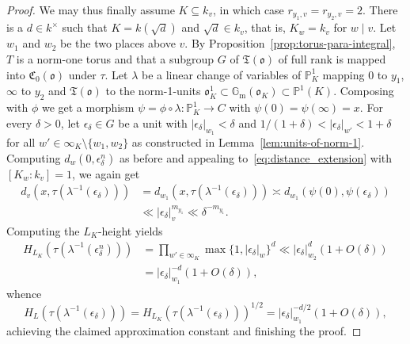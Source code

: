 \documentclass[a4paper, twoside, 11pt]{amsart}
\theoremstyle{definition}
\newcommand{\mC}{\mathfrak{C}}
\newcommand{\mT}{\mathfrak{T}}
\newcommand{\fo}{\mathfrak{o}}
\newcommand{\PP}{\mathbb{P}}
\newcommand{\Gm}{\mathbb{G}_\mathrm{m}}
\begin{document}
\begin{proof}
	We may thus finally assume $K\subseteq k_v$, in which case $r_{{y_1},v}=r_{{y_2},v}=2$.  There is a $d\in k^\times$ such that $K=k(\sqrt{d})$ and $\sqrt{d}\in k_v$, that is, $K_w = k_v$ for $w\mid v$. Let $w_1$ and $w_2$ be the two places above $v$.
	By Proposition~\ref{prop:torus-para-integral}, $T$ is a norm-one torus and that a subgroup $G$ of $\mT(\fo)$ of full rank is mapped into $\mC_0(\fo)$ under $\tau$. Let $\lambda$ be a linear change of variables of $\PP^1_K$ mapping $0$ to $y_1$, $\infty$ to $y_2$ and $\mT(\fo)$ to the norm-1-units $\fo_K^1\subset\Gm(\fo_K)\subset \PP^1(K)$.
	Composing with $\phi$ we get a morphism $\psi = \phi\circ\lambda\colon \PP^1_K\to C$ with $\psi(0)=\psi(\infty)=x$. For every $\delta>0$, let $\epsilon_\delta\in G$ be a unit with $|\epsilon_\delta|_{w_1}<\delta$ and $1/(1+\delta)< |\epsilon_\delta|_{w'}<1+\delta$ for all $w'\in \infty_K\setminus \{w_1,w_2\}$ as constructed in Lemma~\ref{lem:units-of-norm-1}. Computing $d_w(0,\epsilon_\delta^n)$ as before and appealing to~\eqref{eq:distance_extension} with $[K_w:k_v]=1$, we again get
	\begin{equation*}
		\begin{aligned}
			d_v(x, \tau(\lambda^{-1}(\epsilon_\delta))) &= d_{w_1}(x, \tau(\lambda^{-1}(\epsilon_\delta))) \asymp d_{w_1}(\psi(0),\psi(\epsilon_\delta)) \\
			&\ll  |\epsilon_\delta|_v^{m_{y_1}}
			\ll \delta^{-m_{y_1}}.
		\end{aligned}
	\end{equation*}
	Computing the $L_K$-height yields
	\begin{equation*}
		\begin{aligned}
			H_{L_K}(\tau(\lambda^{-1}(\epsilon_\delta^n))) & = \prod_{w'\in \infty_K} \max\{1,|\epsilon_\delta|_w\}^d \ll |\epsilon_\delta|_{w_2}^d (1+O(\delta)) \\
			& = |\epsilon_\delta|_{w_1}^{-d} (1+O(\delta)),
		\end{aligned}
	\end{equation*}
	whence
	\begin{equation*}
		H_{L}(\tau(\lambda^{-1}(\epsilon_\delta))) = H_{L_K}(\tau(\lambda^{-1}(\epsilon_\delta)))^{1/2} = |\epsilon_\delta|_{w_1}^{-d/2} (1+O(\delta)),
	\end{equation*}
	achieving the claimed approximation constant and finishing the proof.
\end{proof}
\end{document}
